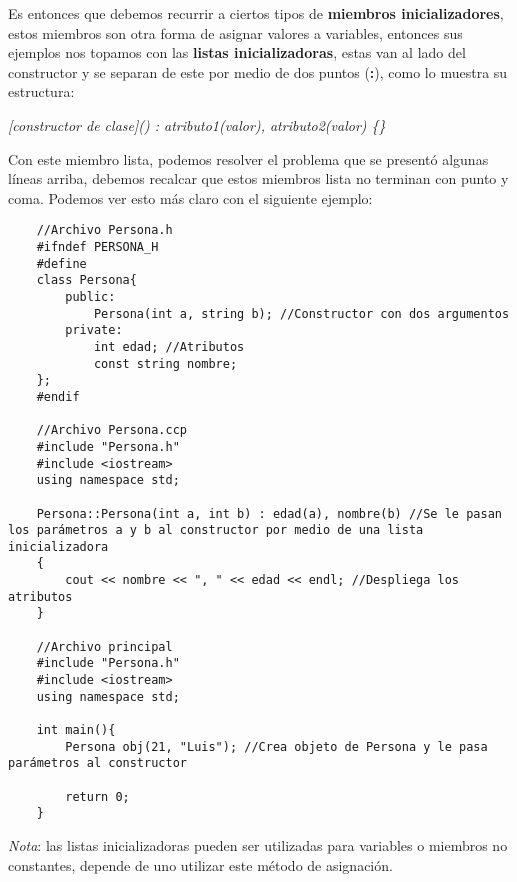 Es entonces que debemos recurrir a ciertos tipos de \textbf{miembros inicializadores}, estos miembros son otra forma de asignar valores a variables, entonces sus ejemplos nos topamos con las \textbf{listas inicializadoras}, estas van al lado del constructor y se separan de este por medio de dos puntos (\textbf{:}), como lo muestra su estructura:
\begin{center}
    \textit{[constructor de clase]() : atributo1(valor), atributo2(valor) \{\}}
\end{center}

Con este miembro lista, podemos resolver el problema que se presentó algunas líneas arriba, debemos recalcar que estos miembros lista no terminan con punto y coma. Podemos ver esto más claro con el siguiente ejemplo:
\begin{lstlisting}
    //Archivo Persona.h
    #ifndef PERSONA_H
    #define
    class Persona{
        public:
            Persona(int a, string b); //Constructor con dos argumentos
        private:
            int edad; //Atributos
            const string nombre;
    };
    #endif
    
    //Archivo Persona.ccp
    #include "Persona.h"
    #include <iostream>
    using namespace std;
    
    Persona::Persona(int a, int b) : edad(a), nombre(b) //Se le pasan los parámetros a y b al constructor por medio de una lista inicializadora
    {
        cout << nombre << ", " << edad << endl; //Despliega los atributos
    }
    
    //Archivo principal
    #include "Persona.h"
    #include <iostream>
    using namespace std;
    
    int main(){
        Persona obj(21, "Luis"); //Crea objeto de Persona y le pasa parámetros al constructor
    
        return 0;
    }
\end{lstlisting}

\textit{Nota}: las listas inicializadoras pueden ser utilizadas para variables o miembros no constantes, depende de uno utilizar este método de asignación.


